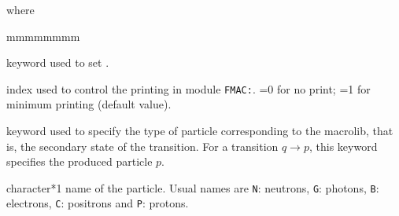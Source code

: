 \noindent where
\begin{ListeDeDescription}{mmmmmmmm}

\item[\moc{EDIT}] keyword used to set .

\item[\dusa{iprint}] index used to control the printing in module {\tt FMAC:}. =0 for no print; =1 for minimum printing (default value).

\item[\moc{PARTICLE}] keyword used to specify the type of particle
corresponding to the {\sc macrolib}, that is, the secondary state of the
transition. For a transition $q \rightarrow p$, this keyword specifies the
produced particle $p$.

\item[\dusa{htype}] character*1 name of the particle. Usual names are {\tt N}: neutrons, {\tt G}: photons, {\tt B}: electrons,
{\tt C}: positrons and {\tt P}: protons.

\end{ListeDeDescription}

\eject
